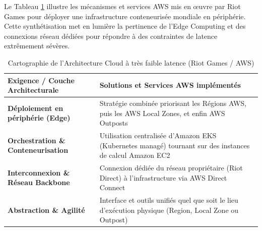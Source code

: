 Le Tableau \ref{tab:riotgames_mapping} illustre les mécanismes et services AWS mis en œuvre par Riot Games pour déployer une infrastructure conteneurisée mondiale en périphérie. Cette synthétisation met en lumière la pertinence de l'Edge Computing et des connexions réseau dédiées pour répondre à des contraintes de latence extrêmement sévères.

\begin{table}[H]
\centering
\caption{Cartographie de l'Architecture Cloud à très faible latence (Riot Games / AWS)}
\label{tab:riotgames_mapping}
\renewcommand{\arraystretch}{1.3}
\begin{tabular}{|p{5.5cm}|p{8.5cm}|}
\hline
\rowcolor{darkgreen!20} \textbf{Exigence / Couche Architecturale} & \textbf{Solutions et Services AWS implémentés} \\ \hline
\textbf{Déploiement en périphérie (Edge)} & Stratégie combinée priorisant les Régions AWS, puis les AWS Local Zones, et enfin AWS Outposts \cite{87} \\ \hline
\textbf{Orchestration \& Conteneurisation} & Utilisation centralisée d'Amazon EKS (Kubernetes managé) tournant sur des instances de calcul Amazon EC2 \cite{87} \\ \hline
\textbf{Interconnexion \& Réseau Backbone} & Connexion dédiée du réseau propriétaire (Riot Direct) à l'infrastructure via AWS Direct Connect \cite{87} \\ \hline
\textbf{Abstraction \& Agilité} & Interface et outils unifiés quel que soit le lieu d'exécution physique (Region, Local Zone ou Outpost) \cite{87} \\ \hline
\end{tabular}
\end{table}





